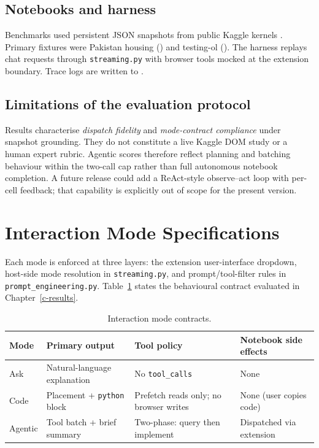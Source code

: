 \subsection{Notebooks and harness}

Benchmarks used persistent JSON snapshots from public Kaggle kernels \parencite{quaranta2021kgtorrent}. Primary fixtures were Pakistan housing ({\ttfamily{}}) and testing-ol ({\ttfamily{}}). The harness replays chat requests through \texttt{streaming.py} with browser tools mocked at the extension boundary. Trace logs are written to {\ttfamily{}}.

\subsection{Limitations of the evaluation protocol}

Results characterise \emph{dispatch fidelity} and \emph{mode-contract compliance} under snapshot grounding. They do not constitute a live Kaggle \ac{DOM} study or a human expert rubric. Agentic scores therefore reflect planning and batching behaviour within the two-call cap rather than full autonomous notebook completion. A future release could add a ReAct-style observe--act loop \parencite{yao2023react} with per-cell feedback; that capability is explicitly out of scope for the present version.

\section{Interaction Mode Specifications}
\label{sec:mode-specs}

Each mode is enforced at three layers: the extension user-interface dropdown, host-side mode resolution in \texttt{streaming.py}, and prompt/tool-filter rules in \texttt{prompt\_engineering.py}. Table~\ref{tab:mode-contracts} states the behavioural contract evaluated in Chapter~\ref{c-results}.

\begin{table}[!ht]
\centering
\caption{Interaction mode contracts.}
\label{tab:mode-contracts}
\footnotesize
\setlength{\tabcolsep}{3pt}
\renewcommand{\arraystretch}{1.05}
\begin{tabular}{|>{\raggedright\arraybackslash}p{1.55cm}|>{\raggedright\arraybackslash}p{2.85cm}|>{\raggedright\arraybackslash}p{3.35cm}|>{\raggedright\arraybackslash}p{3.35cm}|}
\hline
\textbf{Mode} & \textbf{Primary output} & \textbf{Tool policy} & \textbf{Notebook side effects} \\ \hline
Ask & Natural-language explanation & No \texttt{tool\_calls} & None \\ \hline
Code & Placement + \texttt{python} block & Prefetch reads only; no browser writes & None (user copies code) \\ \hline
Agentic & Tool batch + brief summary & Two-phase: query then implement & Dispatched via extension \\ \hline
\end{tabular}
\end{table}

